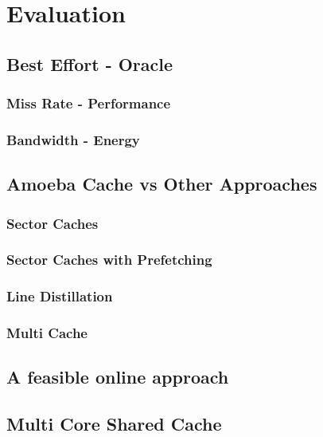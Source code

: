 
%
%

\chapter{Evaluation}
\label{chap:evaluation}

\section{Best Effort - Oracle}
\subsection{Miss Rate - Performance}
\subsection{Bandwidth - Energy}

\section{Amoeba Cache vs Other Approaches}
\subsection{Sector Caches}
\subsection{Sector Caches with Prefetching}
\subsection{Line Distillation}
\subsection{Multi Cache}

\section{A feasible online approach}

\section{Multi Core Shared Cache}



